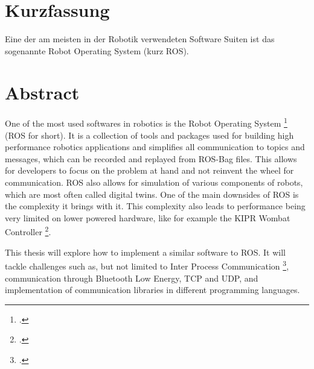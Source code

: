 \chapter{Kurzfassung}

\vspace{10mm}

Eine der am meisten in der Robotik verwendeten Software Suiten ist das sogenannte Robot Operating System (kurz ROS).


\chapter{Abstract}

\vspace{10mm}

One of the most used softwares in robotics is the Robot Operating System \footcite{ros-site} (ROS for short).
It is a collection of tools and packages used for building high performance robotics applications and
simplifies all communication to topics and messages, which can be recorded and replayed from ROS-Bag files.
This allows for developers to focus on the problem at hand and not reinvent the wheel for communication.
ROS also allows for simulation of various components of robots, which are most often called digital twins.
One of the main downsides of ROS is the complexity it brings with it. This complexity also leads to performance
being very limited on lower powered hardware, like for example the KIPR Wombat Controller \footcite{wombat-controller}.

\medskip

This thesis will explore how to implement a similar software to ROS. It will tackle challenges such as, but not limited
to Inter Process Communication \footcite{ipc-begriff}, communication through Bluetooth Low Energy, TCP and UDP, and
implementation of communication libraries in different programming languages.
